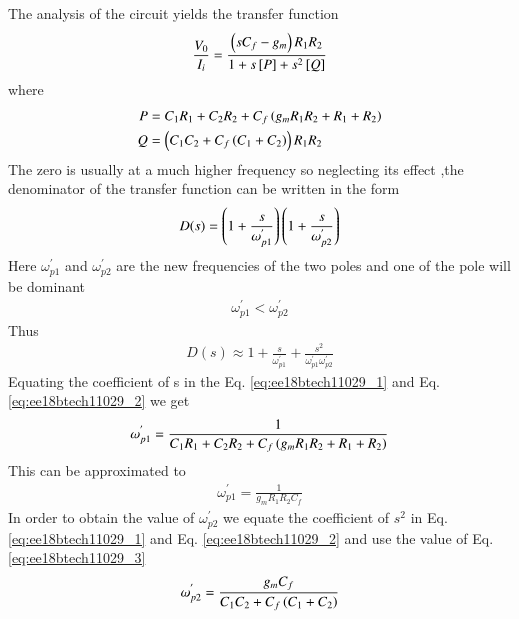 \begin{enumerate}[label=\thesubsection.\arabic*.,ref=\thesubsection.\theenumi]
The analysis of the circuit yields the transfer function
\begin{multline}
    \frac{V_{0}}{I_{i}} = \frac{\brak{sC_{f}-g_{m}}R_{1}R_{2}}{1+s\sbrak{P}+s^{2}\sbrak{Q}}
    \label{eq:ee18btech11029_1}
\end{multline}
where
\begin{align}
    P&={C_{1}R_{1}+C_{2}R_{2}+C_{f}\left(g_{m}R_{1}R_{2}+R_{1}+R_{2}\right)}\\
    Q&={\left(C_{1}C_{2}+C_{f}\left(C_{1}+C_{2}\right)\right)R_{1}R_{2}}
\end{align}
The zero is usually at a much higher frequency so neglecting its effect ,the denominator of the transfer function can be written in the form
\begin{align}
    D(s)=\left(1+\frac{s}{\omega_{p1}^{'}}\right)\left(1+\frac{s}{\omega_{p2}^{'}}\right)
\end{align}
Here $\omega_{p1}^{'}$ and $\omega_{p2}^{'}$ are the new frequencies of the two poles and one of the pole will be dominant
\begin{align}
    \omega_{p1}^{'} < \omega_{p2}^{'}
\end{align}
Thus
\begin{align}
    D(s) \approx 1+\frac{s}{\omega_{p1}^{'}}+\frac{s^{2}}{\omega_{p1}^{'} \omega_{p2}^{'}}
    \label{eq:ee18btech11029_2}
\end{align}
Equating the coefficient of s in the Eq. \eqref{eq:ee18btech11029_1} and Eq. \eqref{eq:ee18btech11029_2}
we get
\begin{align}
    \omega_{p1}^{'} = \frac{1}{C_{1}R_{1}+C_{2}R_{2}+C_{f}\left(g_{m}R_{1}R_{2}+R_{1}+R_{2}\right)}
\end{align}
This can be approximated to 
\begin{align}
    \omega_{p1}^{'} =\frac{1}{g_{m}R_{1}R_{2}C_{f}}
    \label{eq:ee18btech11029_3}
\end{align}
In order to obtain the value of $\omega_{p2}^{'}$ we equate the coefficient of $s^{2}$ in Eq. \eqref{eq:ee18btech11029_1} and Eq. \eqref{eq:ee18btech11029_2} and use the value of Eq. \eqref{eq:ee18btech11029_3}
\begin{align}
    \omega_{p2}^{'} = \frac{g_{m}C_{f}}{{C_{1}C_{2}+C_{f}\brak{C_{1}+C_{2}}}}
    \label{eq:ee18btech11029_4}
\end{align}


\end{enumerate}
